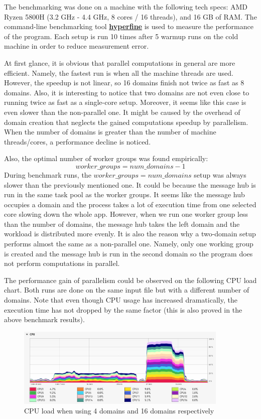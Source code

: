 \documentclass{article}
\begin{document}
The benchmarking was done on a machine with the following tech specs: AMD Ryzen 5800H (3.2 GHz - 4.4 GHz, 8 cores / 16 threads), and 16 GB of RAM. The command-line benchmarking tool \href{https://github.com/sharkdp/hyperfine}{\textbf{hyperfine}} is used to measure the performance of the program. Each setup is run 10 times after 5 warmup runs on the cold machine in order to reduce measurement error.

At first glance, it is obvious that parallel computations in general are more efficient. Namely, the fastest run is when all the machine threads are used. However, the speedup is not linear, so 16 domains finish not twice as fast as 8 domains. Also, it is interesting to notice that two domains are not even close to running twice as fast as a single-core setup. Moreover, it seems like this case is even slower than the non-parallel one. It might be caused by the overhead of domain creation that neglects the gained computations speedup by parallelism. When the number of domains is greater than the number of machine threads/cores, a performance decline is noticed.

Also, the optimal number of worker groups was found empirically: 
$$ worker\_groups = num\_domains - 1 $$
During benchmark runs, the $ worker\_groups = num\_domains $ setup was always slower than the previously mentioned one. It could be because the message hub is run in the same task pool as the worker groups. It seems like the message hub occupies a domain and the process takes a lot of execution time from one selected core slowing down the whole app. However, when we run one worker group less than the number of domains, the message hub takes the left domain and the workload is distributed more evenly. It is also the reason why a two-domain setup performs almost the same as a non-parallel one. Namely, only one working group is created and the message hub is run in the second domain so the program does not perform computations in parallel.

The performance gain of parallelism could be observed on the following CPU load chart. Both runs are done on the same input file but with a different number of domains. Note that even though CPU usage has increased dramatically, the execution time has not dropped by the same factor (this is also proved in the above benchmark results).

\begin{figure}[h]
  \caption{CPU load when using 4 domains and 16 domains respectively}
  \vspace{0.2in}
  \centering
  \includegraphics[width=0.9\textwidth]{resources/cpu_load.png}
\end{figure}
\end{document}
